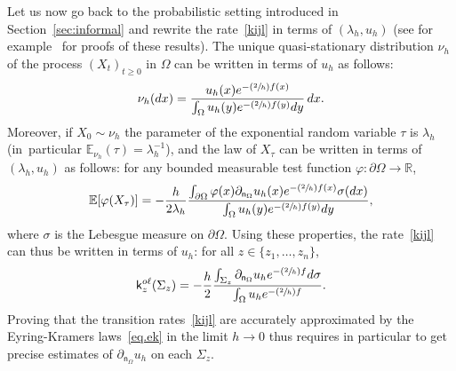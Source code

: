\documentclass[10pt]{amsart}
\newcommand{\Psfrac}[2]{(\sfrac{#1}{#2})}
\theoremstyle{plain}
\theoremstyle{definition}
\begin{document}
Let us now go back to the probabilistic setting introduced
in Section~\ref{sec:informal} and rewrite the rate~\eqref{kijl} in
terms of $(\lambda_h,u_h)$ (see for example~\cite{le2012mathematical}
for proofs of these results). The unique quasi-stationary distribution $\nu_h$ of the
process $(X_t)_{t \ge 0}$ in $\Omega$ can be written in terms of $u_h$
as follows:\vspace*{-3pt}
\begin{equation} \label{eq.expQSD}
\nu_h(dx)=\frac{ u_{h}(x) e^{-\Psfrac{2}{h} f(x)}}{ \int_{\Omega}u_{h}(y) e^{-\Psfrac{2}{h} f(y)}dy}\, dx.
\end{equation}
Moreover, if $X_0 \sim \nu_h$ the parameter of the exponential random
variable $\tau$ is $\lambda_h$ (in~particular $\mathbb E_{\nu_h}(\tau)=\lambda_h^{-1}$), and the law of $X_\tau$ can be
written in terms of $(\lambda_h,u_h)$ as follows: for any bounded measurable test function
$\varphi: \partial \Omega \to \mathbb R$,
\begin{equation}\label{eq.dens}
\mathbb E [\varphi (X_\tau)]=- \frac{h}{2\lambda_{h}}
\frac{\int_{\partial \Omega}\varphi (x) \partial_{\mathsf n_\Omega}
u_{h}(x) e^{-\Psfrac{2}{h} f(x)} \sigma(dx) }{ \int_{\Omega} u_{h}(y) e^{-\Psfrac{2}{h} f(y)} dy},
\end{equation}
where $\sigma$ is the Lebesgue measure on $\partial \Omega$.
Using these properties, the rate~\eqref{kijl} can thus be written in terms
of $u_h$: for all $z \in \{z_1, \ldots, z_n\}$,\vspace*{-3pt}
\begin{equation}\label{eq.expk}
\mathsf k_{z}^{o\ell}(\Sigma_{z})=-\frac {h}{2} \frac{ \int_{\Sigma_{z}} \partial_{\mathsf n_\Omega}
u_h e^{-\Psfrac{2}{h} f} d\sigma }{ \int_\Omega u_h e^{-\Psfrac{2}{h} f}}.
\end{equation}
Proving that the transition rates~\eqref{kijl} are accurately
approximated by the Eyring-Kramers laws~\eqref{eq.ek} in the limit $h
\to 0$ thus requires in particular to get precise estimates of $\partial_{\mathsf n_\Omega}
u_h$ on each $\Sigma_{z}$.
\end{document}
